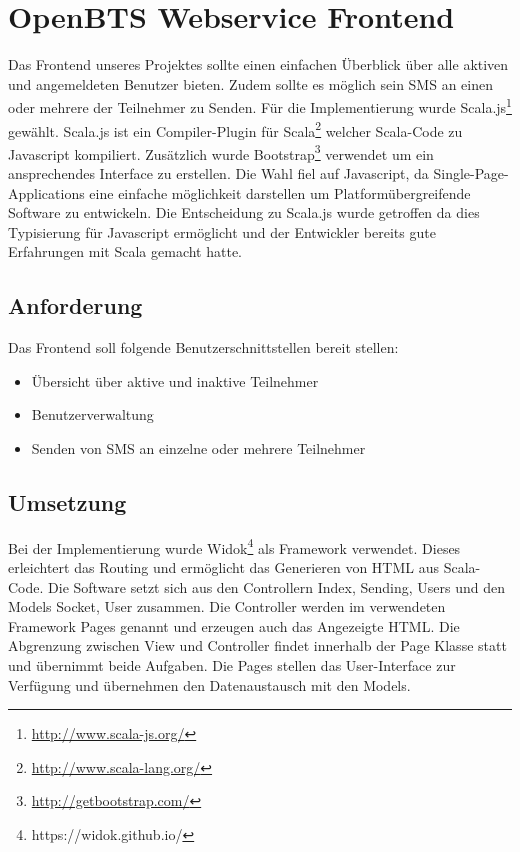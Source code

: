 \section{OpenBTS Webservice Frontend}
\label{sec:frontend}
Das Frontend unseres Projektes sollte einen einfachen Überblick über alle aktiven und angemeldeten Benutzer bieten. Zudem sollte es möglich sein SMS an einen oder mehrere der Teilnehmer zu Senden. Für die Implementierung wurde Scala.js\footnote{\url{http://www.scala-js.org/}} gewählt. Scala.js ist ein Compiler-Plugin für Scala\footnote{\url{http://www.scala-lang.org/}} welcher Scala-Code zu Javascript kompiliert. Zusätzlich wurde Bootstrap\footnote{\url{http://getbootstrap.com/}} verwendet um ein ansprechendes Interface zu erstellen.
Die Wahl fiel auf Javascript, da Single-Page-Applications eine einfache möglichkeit darstellen um Platformübergreifende Software zu entwickeln. Die Entscheidung zu Scala.js wurde getroffen da dies Typisierung für Javascript ermöglicht und der Entwickler bereits gute Erfahrungen mit Scala gemacht hatte.

\subsection{Anforderung}
Das Frontend soll folgende Benutzerschnittstellen bereit stellen:
\begin{itemize}
	\item Übersicht über aktive und inaktive Teilnehmer
	\item Benutzerverwaltung
	\item Senden von SMS an einzelne oder mehrere Teilnehmer
\end{itemize}

\subsection{Umsetzung}
Bei der Implementierung wurde Widok\footnote{https://widok.github.io/} als Framework verwendet. Dieses erleichtert das Routing und ermöglicht das Generieren von HTML aus Scala-Code.
Die Software setzt sich aus den Controllern Index, Sending, Users und den Models Socket, User zusammen. Die Controller werden im verwendeten Framework Pages genannt und erzeugen auch das Angezeigte HTML. Die Abgrenzung zwischen View und Controller findet innerhalb der Page Klasse statt und übernimmt beide Aufgaben. Die Pages stellen das User-Interface zur Verfügung und übernehmen den Datenaustausch mit den Models.

\FloatBarrier
